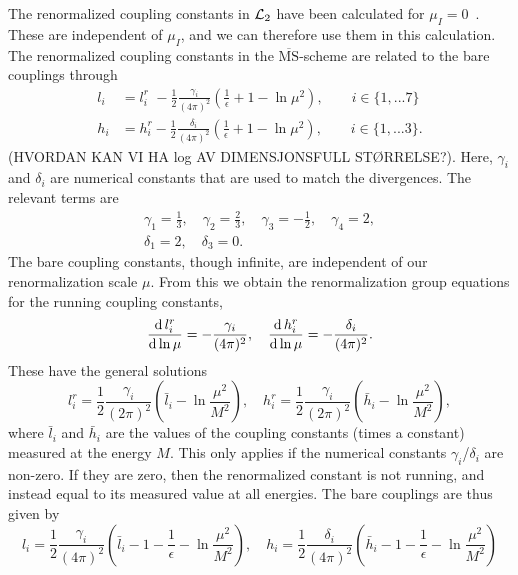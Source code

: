 The renormalized coupling constants in $\mathcal{L}_2$ have been calculated for $\mu_I = 0$~\cite{Gasser-Leutwyler:chiral}.
These are independent of $\mu_I$, and we can therefore use them in this calculation.
The renormalized coupling constants in the $\overline{\mathrm{MS}}$-scheme are related to the bare couplings through
\begin{align}
    l_i 
    & = 
    l_i^r \, \,
    - \frac{1}{2} \frac{\gamma_i }{(4 \pi)^2} 
    \left(\frac{1}{\epsilon} + 1 - \ln \mu^2\right),
    \quad \quad
    i \in \{1, ... 7\} 
    \\
    h_i 
    & = 
    h_i^r
    - \frac{1}{2} \frac{\delta_i }{(4 \pi)^2} 
    \left(\frac{1}{\epsilon} + 1 - \ln \mu^2 \right), 
    \quad \quad
    i \in \{1, ... 3\}.
\end{align}
(HVORDAN KAN VI HA log AV DIMENSJONSFULL STØRRELSE?).
Here, $\gamma_i$ and $\delta_i$ are numerical constants that are used to match the divergences.
The relevant terms are
\begin{gather}
    \gamma_1 = \frac{1}{3}, \quad
    \gamma_2 = \frac{2}{3}, \quad
    \gamma_3 = - \frac{1}{2}, \quad
    \gamma_4 = 2, \\
    \delta_1 = 2, \quad
    \delta_3 = 0.
\end{gather}
The bare coupling constants, though infinite, are independent of our renormalization scale $\mu$.
From this we obtain the renormalization group equations for the running coupling constants,
\begin{equation}
    \diff{\, l_i^r}{\ln \mu } = - \frac{\gamma_i}{(4 \pi)^2}, \quad
    \diff{\, h_i^r}{\ln \mu } = - \frac{\delta_i}{(4 \pi)^2}.
\end{equation}
These have the general solutions
\begin{equation}
    l_i^r 
    = \frac{1}{2} \frac{\gamma_i}{(2 \pi)^2} 
    \left( \bar l_i - \ln{\frac{\mu^2}{M^2}} \right),
    \quad
    h_i^r 
    = \frac{1}{2} \frac{\gamma_i}{(2 \pi)^2} 
    \left( \bar h_i - \ln{\frac{\mu^2}{M^2}} \right),
\end{equation}
where $\bar l_i$ and $\bar h_i$ are the values of the coupling constants (times a constant) measured at the energy $M$.
This only applies if the numerical constants $\gamma_i$/$\delta_i$ are non-zero.
If they are zero, then the renormalized constant is not running, and instead equal to its measured value at all energies.
The bare couplings are thus given by
\begin{equation}
    l_i = \frac{1}{2} \frac{\gamma_i}{(4 \pi)^2}
    \left(\bar l_i - 1 - \frac{1}{\epsilon} - \ln\frac{\mu^2}{M^2}\right), \quad
    h_i = \frac{1}{2} \frac{\delta_i}{(4 \pi)^2}
    \left(\bar h_i - 1 - \frac{1}{\epsilon} - \ln\frac{\mu^2}{M^2}\right)
\end{equation}
